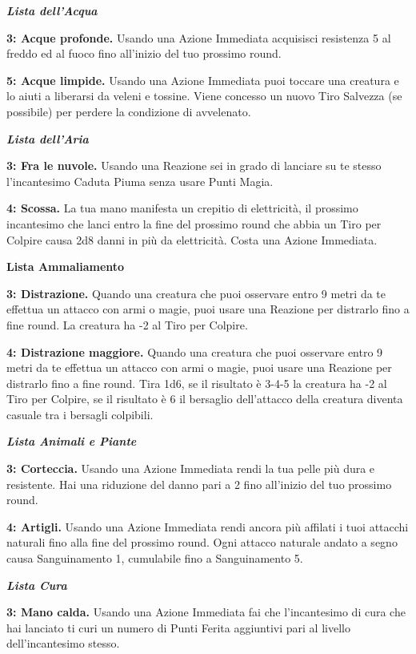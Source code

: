 \begin{multicols}{2}
\emph{\textbf{Lista dell'Acqua}}

\textbf{3: Acque profonde.} Usando una Azione Immediata acquisisci resistenza 5 al freddo ed al fuoco fino all'inizio del tuo prossimo round.

\textbf{5: Acque limpide.} Usando una Azione Immediata puoi toccare una creatura e lo aiuti a liberarsi da veleni e tossine. Viene concesso un nuovo Tiro Salvezza (se possibile) per perdere la condizione di avvelenato.

\emph{\textbf{Lista dell'Aria}}

\textbf{3: Fra le nuvole.} Usando una Reazione sei in grado di lanciare su te stesso l'incantesimo Caduta Piuma senza usare Punti Magia.

\textbf{4: Scossa.} La tua mano manifesta un crepitio di elettricità, il prossimo incantesimo che lanci entro la fine del prossimo round che abbia un Tiro per Colpire causa 2d8 danni in più da elettricità. Costa una Azione Immediata.

\textbf{Lista Ammaliamento}

\textbf{3: Distrazione.} Quando una creatura che puoi osservare entro 9 metri da te effettua un attacco con armi o magie, puoi usare una Reazione per distrarlo fino a fine round. La creatura ha -2 al Tiro per Colpire.

\textbf{4: Distrazione maggiore.} Quando una creatura che puoi osservare entro 9 metri da te effettua un attacco con armi o magie, puoi usare una Reazione per distrarlo fino a fine round. Tira 1d6, se il risultato è 3-4-5 la creatura ha -2 al Tiro per Colpire, se il risultato è 6 il bersaglio dell'attacco della creatura diventa casuale tra i bersagli colpibili.

\emph{\textbf{Lista Animali e Piante}}

\textbf{3: Corteccia.} Usando una Azione Immediata rendi la tua pelle più dura e resistente. Hai una riduzione del danno pari a 2 fino all'inizio del tuo prossimo round.

\textbf{4: Artigli.} Usando una Azione Immediata rendi ancora più affilati i tuoi attacchi naturali fino alla fine del prossimo round. Ogni attacco naturale andato a segno causa Sanguinamento 1, cumulabile fino a Sanguinamento 5.

\emph{\textbf{Lista Cura}}

\textbf{3: Mano calda.} Usando una Azione Immediata fai che l'incantesimo di cura che hai lanciato ti curi un numero di Punti Ferita aggiuntivi pari al livello dell'incantesimo stesso.


\end{multicols}
